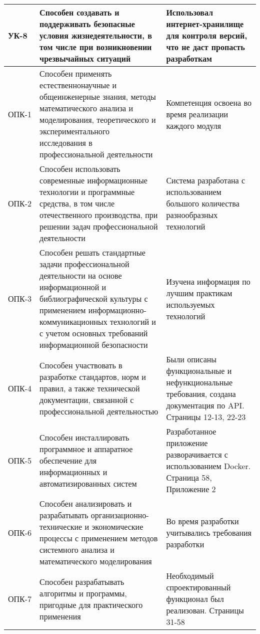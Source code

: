 \documentclass[a4paper,article]{article}
\begin{document}
\begin{sloppypar}
\begin{xltabular}{\textwidth} { |
                >{\hsize} X |
                >{\hsize} X |
                >{\hsize} X | }
            \hline
            УК-8
            & Способен создавать и поддерживать безопасные условия жизнедеятельности, в том числе при возникновении чрезвычайных ситуаций
            & Использовал интернет-хранилище для контроля версий, что не даст пропасть разработкам \\
            \hline
            ОПК-1
            & Способен применять естественнонаучные и общеинженерные знания, методы математического анализа и моделирования, теоретического и экспериментального исследования в профессиональной деятельности
            & Компетенция освоена во время реализации каждого модуля \\
            \hline
            ОПК-2
            & Способен использовать современные информационные технологии и программные средства, в том числе отечественного производства, при решении задач профессиональной деятельности
            & Система разработана с использованием большого количества разнообразных технологий \\
            \hline
            ОПК-3
            & Способен решать стандартные задачи профессиональной деятельности на основе информационной и библиографической культуры с применением информационно-коммуникационных технологий и с учетом основных требований информационной безопасности
            & Изучена информация по лучшим практикам используемых технологий \\
            \hline
            ОПК-4
            & Способен участвовать в разработке стандартов, норм и правил, а также технической документации, связанной с профессиональной деятельностью
            & Были описаны функциональные и нефункциональные требования, создана документация по API. Страницы 12-13, 22-23 \\
            \hline
            ОПК-5
            & Способен инсталлировать программное и аппаратное обеспечение для информационных и автоматизированных систем
            & Разработанное приложение разворачивается с использованием Docker. Страница 58, Приложение 2 \\
            \hline
            ОПК-6
            & Способен анализировать и разрабатывать организационно-технические и экономические процессы с применением методов системного анализа и математического моделирования
            & Во время разработки учитывались требования разработки \\
            \hline
            ОПК-7
            & Способен разрабатывать алгоритмы и программы, пригодные для практического применения
            & Необходимый спроектированный функционал был реализован. Страницы 31-58 \\

\end{xltabular}
\end{sloppypar}
\end{document}
